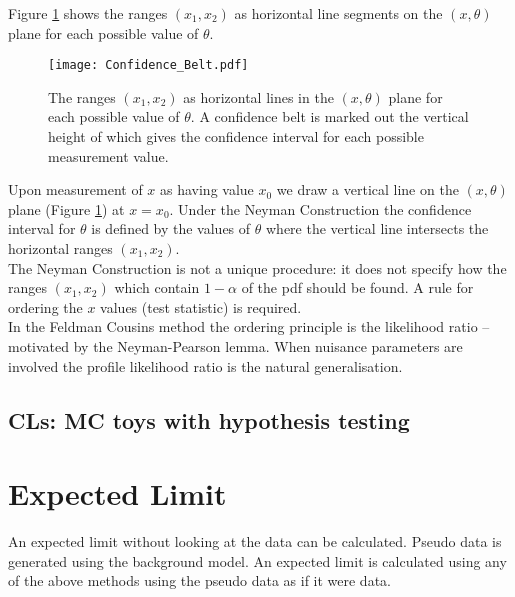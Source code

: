 Figure \ref{fig:Confidence_Belt} shows the ranges $\left(x_{1},x_{2}\right)$ as
horizontal line segments on the $\left(x,\theta\right)$ plane for each possible 
value of $\theta$. \\

\begin{figure}
\begin{center}
\texttt{[image: Confidence\_Belt.pdf]}
\caption{The ranges $\left(x_{1},x_{2}\right)$ as horizontal lines in the 
$\left(x,\theta\right)$ plane for each possible value of $\theta$. A
confidence belt is marked out the vertical height of which gives the
confidence interval for each possible measurement value.}
\label{fig:Confidence_Belt}
\end{center}
\end{figure}

Upon measurement of $x$ as having value $x_{0}$ we draw a vertical line on the 
$\left(x,\theta\right)$ plane (Figure \ref{fig:Confidence_Belt}) at $x = x_{0}$.
Under the Neyman Construction the confidence interval for $\theta$ is defined by
the values of $\theta$ where the vertical line intersects the horizontal ranges 
$\left(x_{1},x_{2}\right)$. \\

The Neyman Construction is not a unique procedure: it does not specify how the 
ranges $\left(x_{1},x_{2}\right)$ which contain $1 - \alpha$ of the pdf should
be found. A rule for ordering the $x$ values (test statistic) is required. \\

In the Feldman Cousins method the ordering principle is the likelihood ratio -- 
motivated by the Neyman-Pearson lemma. When nuisance parameters are involved the
profile likelihood ratio is the natural generalisation.

\subsection{CLs: MC toys with hypothesis testing}


\section{Expected Limit}

An expected limit without looking at the data can be calculated. Pseudo data is
generated using the background model. An expected limit is calculated using any
of the above methods using the pseudo data as if it were data. \\

